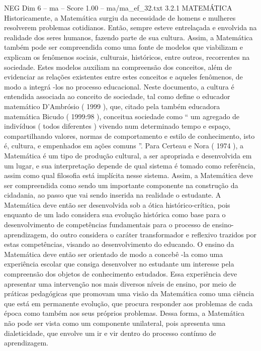 \begin{textsample}{NEG Dim 6 – ma – Score 1.00 – ma/ma\_ef\_32.txt}  \label{ex:f6_neg_200}
3.2.1 MATEMÁTICA Historicamente, a Matemática surgiu da necessidade de homens e mulheres resolverem problemas cotidianos.
Então, sempre esteve entrelaçada e envolvida na realidade dos seres humanos, fazendo parte de sua cultura.
Assim, a Matemática também pode ser compreendida como uma fonte de modelos que viabilizam e explicam os fenômenos sociais, culturais, históricos, entre outros, recorrentes na sociedade.
Estes modelos auxiliam na compreensão dos conceitos, além de evidenciar as relações existentes entre estes conceitos e aqueles fenômenos, de modo a integrá -los no processo educacional.
Neste documento, a cultura é entendida associada ao conceito de sociedade, tal como define o educador matemático D’Ambrósio ( 1999 ), que, citado pela também educadora matemática Bicudo ( 1999:98 ), conceitua sociedade como “ um agregado de indivíduos ( todos diferentes ) vivendo num determinado tempo e espaço, compartilhando valores, normas de comportamento e estilo de conhecimento, isto é, cultura, e empenhados em ações comuns ”.
Para Certeau e Nora ( 1974 ), a Matemática é um tipo de produção cultural, a ser apropriada e desenvolvida em um lugar, e sua interpretação depende de qual sistema é tomado como referência, assim como qual filosofia está implícita nesse sistema.
Assim, a Matemática deve ser compreendida como sendo um importante componente na construção da cidadania, ao passo que vai sendo inserida na realidade o estudante.
A Matemática deve então ser desenvolvida sob a ótica histórico-crítica, pois enquanto de um lado considera sua evolução histórica como base para o desenvolvimento de competências fundamentais para o processo de ensino-aprendizagem, do outro considera o caráter transformador e reflexivo trazidos por estas competências, visando ao desenvolvimento do educando.
O ensino da Matemática deve então ser orientado de modo a concebê -la como uma experiência escolar que consiga desenvolver no estudante um interesse pela compreensão dos objetos de conhecimento estudados.
Essa experiência deve apresentar uma intervenção nos mais diversos níveis de ensino, por meio de práticas pedagógicas que promovam uma visão da Matemática como uma ciência que está em permanente evolução, que procura responder aos problemas de cada época como também aos seus próprios problemas.
Dessa forma, a Matemática não pode ser vista como um componente unilateral, pois apresenta uma dialeticidade, que envolve um ir e vir dentro do processo contínuo de aprendizagem.

\end{textsample}
